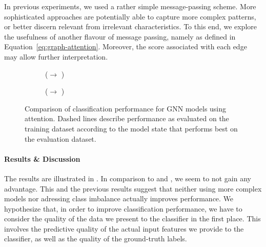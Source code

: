 \documentclass[
	fontsize=10pt, %
	twoside=true, %
	secnumdepth=1, %
  toc=indentunnumbered %
]{kaobook}
\begin{document}
In previous experiments, we used a rather simple message-passing scheme. More
sophisticated approaches are potentially able to capture more complex patterns,
or better discern relevant from irrelevant characteristics. To this end, we
explore the usefulness of another flavour of message passing, namely  as defined in Equation~\ref{eq:graph-attention}. Moreover, the
score associated with each edge may allow further interpretation.




\begin{figure}[h]
\centering
\begin{subfigure}[h]{0.48\linewidth}
  \caption{(\ADLast $\rightarrow$ \PDMap)}
\end{subfigure}
\begin{subfigure}[h]{0.48\linewidth}
  \caption{(\ADLast $\rightarrow$ \ReconMap{})}
\end{subfigure}
\caption{Comparison of classification performance for GNN models using
  attention. Dashed lines describe performance as evaluated on the training
  dataset according to the model state that performs best on the evaluation dataset.}
\label{fig:results-attention}
\end{figure}

\paragraph{Results \& Discussion} The results are illustrated in
. In comparison to 
and , we seem to not gain any advantage.
%
This and the previous results suggest that neither using more complex models nor
adressing class imbalance actually improves performance. We hypothesize that, in
order to improve classification performance, we have to consider the quality of
the data we present to the classifier in the first place. This involves the
predictive quality of the actual input features we provide to the classifier, as
well as the quality of the ground-truth labels.
\end{document}
